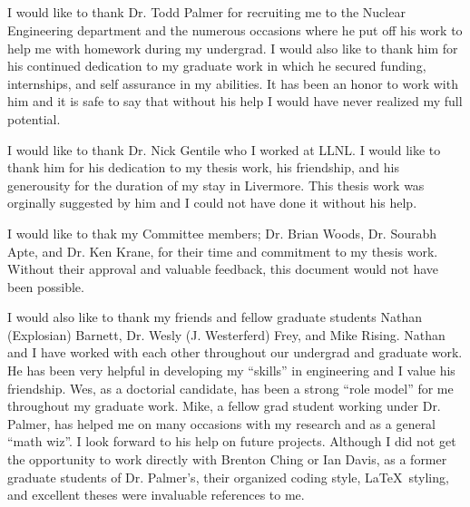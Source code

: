 
\begin{center}
\section*{}
\label{sec:ack}
\end{center}

\thispagestyle{empty}

\noindent
	\indent I would like to thank Dr. Todd Palmer for recruiting me to the Nuclear Engineering department and the numerous occasions where he put off his work to help me with homework during my undergrad. I would also like to thank him for his continued dedication to my graduate work in which he secured funding, internships, and self assurance in my abilities. It has been an honor to work with him and it is safe to say that without his help I would have never realized my full potential. 

\noindent
	\indent I would like to thank Dr. Nick Gentile who I worked at LLNL. I would like to thank him for his dedication to my thesis work, his friendship, and his generousity for the duration of my stay in Livermore. This thesis work was orginally suggested by him and I could not have done it without his help.
	
\noindent 
	\indent I would like to thak my Committee members; Dr. Brian Woods, Dr. Sourabh Apte, and Dr. Ken Krane, for their time and commitment to my thesis work. Without their approval and valuable feedback, this document would not have been possible.

\noindent
	\indent I would also like to thank my friends and fellow graduate students Nathan (Explosian) Barnett, Dr. Wesly (J. Westerferd) Frey, and Mike Rising. Nathan and I have worked with each other throughout our undergrad and graduate work. He has been very helpful in developing my ``skills'' in engineering and I value his friendship. Wes, as a doctorial candidate, has been a strong ``role model'' for me throughout my graduate work. Mike, a fellow grad student working under Dr. Palmer, has helped me on many occasions with my research and as a general ``math wiz''. I look forward to his help on future projects. Although I did not get the opportunity to work directly with Brenton Ching or Ian Davis, as a former graduate students of Dr. Palmer's, their organized coding style, \LaTeX\ styling, and excellent theses were invaluable references to me.
	
